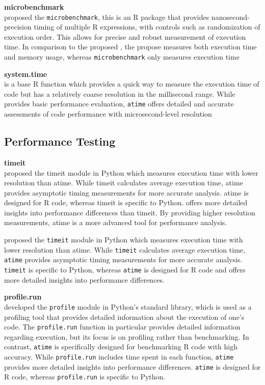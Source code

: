 \textbf{microbenchmark} \\
\citet{microbenchmark} proposed the \texttt{microbenchmark}, this is an R package that provides nanosecond-precision timing of multiple R expressions, with controls such as randomization of execution order. This allows for precise and robust measurement of execution time. In comparison to the proposed , the propose measures both execution time and memory usage, whereas \texttt{microbenchmark} only measures execution time 
\vspace{0.1in}

\textbf{system.time} \\
\citet{system.time} is a base R function which provides a quick way to measure the execution time of code but has a relatively coarse resolution in the millisecond range.  While \citet{system.time} provides basic performance evaluation, \texttt{atime} offers detailed and accurate assessments of code performance with microsecond-level resolution
\vspace{0.1in}

\subsection{Performance Testing}
\textbf{timeit} \\

\citet{timeit} proposed the timeit module in Python which measures execution time with lower resolution than atime. While timeit calculates average execution time, atime provides asymptotic timing measurements for more accurate analysis. atime is designed for R code, whereas timeit is specific to Python.  offers more detailed insights into performance differences than timeit. By providing higher resolution measurements, atime is a more advanced tool for performance analysis.

\citet{timeit} proposed the \texttt{timeit} module in Python which measures execution time with lower resolution than atime. While \texttt{timeit} calculates average execution time, \texttt{atime} provides asymptotic timing measurements for more accurate analysis. \texttt{timeit} is specific to Python, whereas \texttt{atime} is designed for R code and offers more detailed insights into performance differences.

\vspace{0.1in}

\textbf{profile.run} \\
\citet{profile} developed the \texttt{profile} module in Python's standard library, which is used as a profiling tool that provides detailed information about the execution of one's code. The \texttt{profile.run} function in particular provides detailed information regarding execution, but its focus is on profiling rather than benchmarking. In contrast, \texttt{atime} is specifically designed for benchmarking R code with high accuracy. While \texttt{profile.run} includes time spent in each function, \texttt{atime} provides more detailed insights into performance differences. \texttt{atime} is designed for R code, whereas \texttt{profile.run} is specific to Python.
\vspace{0.1in}


